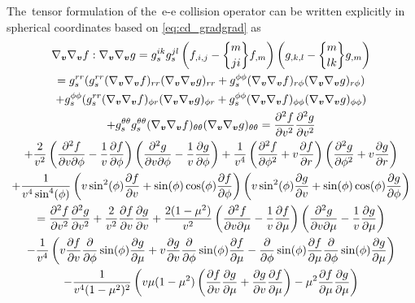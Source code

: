 \documentclass[preprint,12pt]{elsarticle}
\newcommand{\pdv}[2]{\frac{\partial{#1}}{\partial{#2}}}
\newcommand{\ppdv}[3]{\frac{\partial^2 #1}{\partial #2\partial #3}}
\newcommand{\christ}[3]{\genfrac{\{}{\}}{0pt}{}{#1}{#2 #3}}
\newcommand{\vmag}{v}
\begin{document}
The~tensor formulation of the~e-e collision operator can be written explicitly
in spherical coordinates based on \eqref{eq:cd_gradgrad} as 
\begin{multline}
  \gv\gv \ft : \gv\gv \gt = 
  g_s^{ik}g_s^{jl}\left(f_{,i,j} - \christ{m}{j}{i} f_{,m}\right) 
  \left(g_{,k,l} - \christ{m}{l}{k} g_{,m} \right) \\
  = g_s^{rr}(g_s^{rr} (\gv\gv \ft)_{rr} (\gv\gv \gt)_{rr} 
    + g_s^{\phi\phi} (\gv\gv \ft)_{r\phi} (\gv\gv \gt)_{r\phi} ) \\ 
  + g_s^{\phi\phi}(g_s^{rr} (\gv\gv \ft)_{\phi r} (\gv\gv \gt)_{\phi r} 
    + g_s^{\phi\phi} (\gv\gv \ft)_{\phi\phi} (\gv\gv \gt)_{\phi\phi} ) \\
  + g_s^{\theta\theta}g_s^{\theta\theta} (\gv\gv \ft)_{\theta\theta}
  (\gv\gv \gt)_{\theta\theta} = 
  \frac{\partial^2 \ft}{\partial \vmag^2}
  \frac{\partial^2 \gt}{\partial \vmag^2} \\
  + \frac{2}{\vmag^2}
  \left(\ppdv{\ft}{\vmag}{\phi} - \frac{1}{\vmag}\pdv{\ft}{\phi} \right)
  \left(\ppdv{\gt}{\vmag}{\phi} - \frac{1}{\vmag}\pdv{\gt}{\phi} \right) 
  + \frac{1}{\vmag^4}
  \left(\frac{\partial^2 \ft}{\partial \phi^2} + \vmag\pdv{\ft}{r}\right)
  \left(\frac{\partial^2 \gt}{\partial \phi^2} + \vmag\pdv{\gt}{r}\right)\\
  + \frac{1}{\vmag^4\sin^4(\phi)}
  \left(
  \vmag\sin^2(\phi)\pdv{\ft}{\vmag} + \sin(\phi)\cos(\phi)\pdv{\ft}{\phi}
  \right)
  \left(
  \vmag\sin^2(\phi)\pdv{\gt}{\vmag} + \sin(\phi)\cos(\phi)\pdv{\gt}{\phi}
  \right) \\
  = \frac{\partial^2 \ft}{\partial \vmag^2}
  \frac{\partial^2 \gt}{\partial \vmag^2}
  + \frac{2}{\vmag^2}\pdv{\ft}{\vmag}\pdv{\gt}{\vmag} 
  + \frac{2(1-\mu^2)}{\vmag^2}
  \left(\ppdv{\ft}{\vmag}{\mu} - \frac{1}{\vmag}\pdv{\ft}{\mu} \right)
  \left(\ppdv{\gt}{\vmag}{\mu} - \frac{1}{\vmag}\pdv{\gt}{\mu} \right) \\
  - \frac{1}{\vmag^4}\left(
  \vmag\pdv{\ft}{\vmag}\pdv{}{\phi}\sin(\phi)\pdv{\gt}{\mu} 
  + \vmag\pdv{\gt}{\vmag}\pdv{}{\phi}\sin(\phi)\pdv{\ft}{\mu}
  - \pdv{}{\phi}\sin(\phi)\pdv{\ft}{\mu}\pdv{}{\phi}\sin(\phi)\pdv{\gt}{\mu}
  \right) \\
  - \frac{1}{\vmag^4(1-\mu^2)^2}
  \left(
  \vmag\mu(1-\mu^2)\left(\pdv{\ft}{\vmag}\pdv{\gt}{\mu} 
  + \pdv{\gt}{\vmag}\pdv{\ft}{\mu}\right) - \mu^2\pdv{\ft}{\mu}\pdv{\gt}{\mu}
  \right)
  \nonumber
\end{multline}
\end{document}
